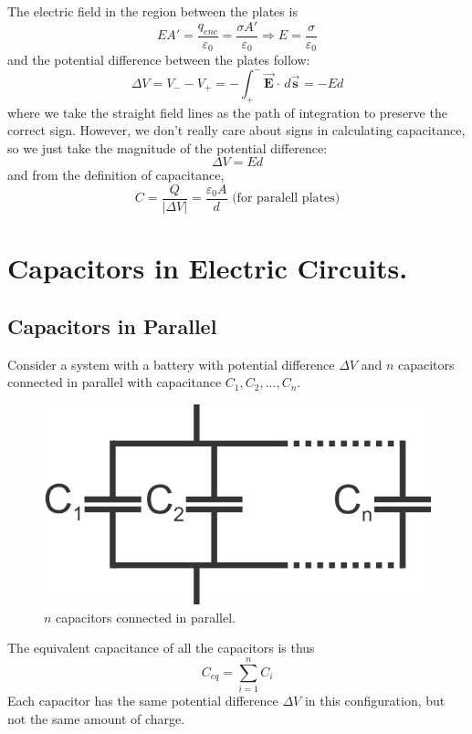 \documentclass[11pt, letterpaper]{article}
\newcommand{\bv}[2][]{\bm{\vec{#2}_{#1}}}
\begin{document}
The electric field in the region between the plates is \[EA' = \frac{q_{enc}}{\varepsilon_0} = \frac{\sigma A'}{\varepsilon_0}\Rightarrow E = \frac{\sigma}{\varepsilon_0}\] and the potential difference between the plates follow: \[\Delta V = V_- - V_+ = -\int_+^-\bv{E}\cdot\, d\bv{s} = -Ed\] where we take the straight field lines as the path of integration to preserve the correct sign. However, we don't really care about signs in calculating capacitance, so we just take the magnitude of the potential difference: \[\Delta V= Ed\] and from the definition of capacitance,
\begin{equation}
	\boxed{C = \frac{Q}{|\Delta V|} = \frac{\varepsilon_0 A}{d} \text{ (for paralell plates)}}
\end{equation}

\section{Capacitors in Electric Circuits.}
\subsection{Capacitors in Parallel}
Consider a system with a battery with potential difference $\Delta V$ and $n$ capacitors connected in parallel with capacitance $C_1, C_2,...,C_n$. 
\begin{figure}[h!]
	\centering
	\includegraphics[scale=0.2]{parallel.png}
	\caption{$n$ capacitors connected in parallel.}
	\label{fig:parallel}
\end{figure}

The equivalent capacitance of all the capacitors is thus
\begin{equation}\label{eqn:parallel}
	\boxed{C_{eq} = \sum_{i = 1}^{n}C_i}
\end{equation}
Each capacitor has the same potential difference $\Delta V$ in this configuration, but not the same amount of charge.
\end{document}
